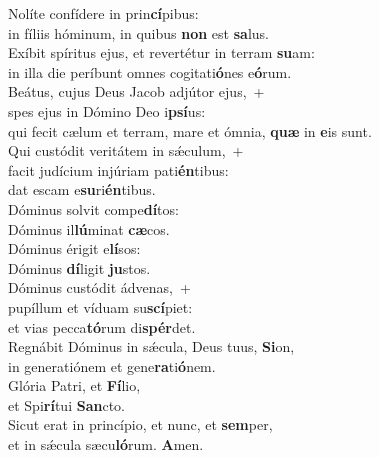 \evenverse Nolíte confídere in prin\textbf{cí}pibus:~\*\\
\evenverse in fíliis hóminum, in quibus \textbf{non} est \textbf{sa}lus.\\
\oddverse Exíbit spíritus ejus, et revertétur in terram \textbf{su}am:~\*\\
\oddverse in illa die períbunt omnes cogitati\textbf{ó}nes e\textbf{ó}rum.\\
\evenverse Beátus, cujus Deus Jacob adjútor ejus,~+\\
\evenverse  spes ejus in Dómino Deo i\textbf{psí}us:~\*\\
\evenverse qui fecit cælum et terram, mare et ómnia, \textbf{quæ} in \textbf{e}is sunt.\\
\oddverse Qui custódit veritátem in sǽculum,~+\\
\oddverse  facit judícium injúriam pati\textbf{én}tibus:~\*\\
\oddverse dat escam e\textbf{su}ri\textbf{én}tibus.\\
\evenverse Dóminus solvit compe\textbf{dí}tos:~\*\\
\evenverse Dóminus il\textbf{lú}minat \textbf{cæ}cos.\\
\oddverse Dóminus érigit e\textbf{lí}sos:~\*\\
\oddverse Dóminus \textbf{dí}ligit \textbf{ju}stos.\\
\evenverse Dóminus custódit ádvenas,~+\\
\evenverse  pupíllum et víduam su\textbf{scí}piet:~\*\\
\evenverse et vias pecca\textbf{tó}rum di\textbf{spér}det.\\
\oddverse Regnábit Dóminus in sǽcula, Deus tuus, \textbf{Si}on,~\*\\
\oddverse in generatiónem et gene\textbf{ra}ti\textbf{ó}nem.\\
\evenverse Glória Patri, et \textbf{Fí}lio,~\*\\
\evenverse et Spi\textbf{rí}tui \textbf{San}cto.\\
\oddverse Sicut erat in princípio, et nunc, et \textbf{sem}per,~\*\\
\oddverse et in sǽcula sæcu\textbf{ló}rum. \textbf{A}men.\\
